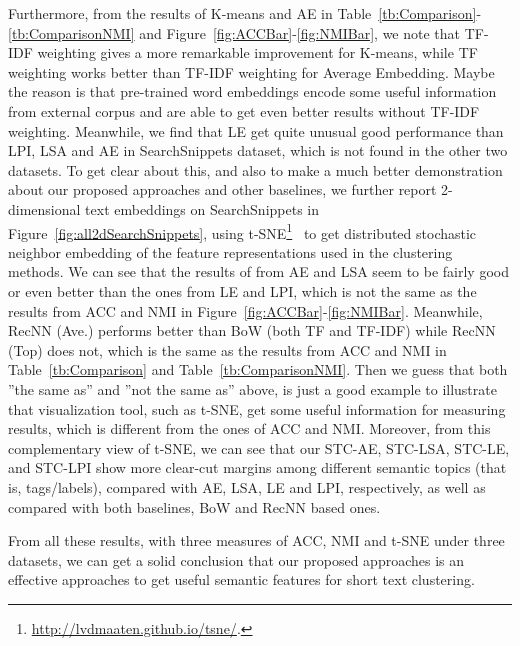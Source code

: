 \documentclass[review]{elsarticle}
\begin{document}
Furthermore, from the results of K-means and AE in Table~\ref{tb:Comparison}-\ref{tb:ComparisonNMI} and Figure~\ref{fig:ACCBar}-\ref{fig:NMIBar}, we note that TF-IDF weighting gives a more remarkable improvement for K-means, while TF weighting works better than TF-IDF weighting for Average Embedding. Maybe the reason is that pre-trained word embeddings encode some useful information from external corpus and are able to get even better results without TF-IDF weighting. Meanwhile, we find that LE get quite unusual good performance than LPI, LSA and AE in SearchSnippets dataset, which is not found in the other two datasets. To get clear about this, and also to make a much better demonstration about our proposed approaches and other baselines, we further report 2-dimensional text embeddings on SearchSnippets in Figure~\ref{fig:all2dSearchSnippets}, using t-SNE\footnote{\url{http://lvdmaaten.github.io/tsne/}.}~\cite{39_van2008visualizing} to get distributed stochastic neighbor embedding of the feature representations used in the clustering methods.
We can see that the results of from AE and LSA seem to be fairly good or even better than the ones from LE and LPI, which is not the same as the results from ACC and NMI in Figure~\ref{fig:ACCBar}-\ref{fig:NMIBar}. Meanwhile, RecNN (Ave.) performs better than BoW (both TF and TF-IDF) while RecNN (Top) does not, which is the same as the results from ACC and NMI in Table~\ref{tb:Comparison} and Table~\ref{tb:ComparisonNMI}. Then we guess that both ''the same as'' and ''not the same as'' above, is just a good example to illustrate that visualization tool, such as t-SNE, get some useful information for measuring results, which is different from the ones of ACC and NMI. Moreover, from this complementary view of t-SNE, we can see that our STC-AE, STC-LSA, STC-LE, and STC-LPI show more clear-cut margins among different semantic topics (that is, tags/labels), compared with AE, LSA, LE and LPI, respectively, as well as compared with both baselines, BoW and RecNN based ones.

From all these results, with three measures of ACC, NMI and t-SNE under three datasets, we can get a solid conclusion that our proposed approaches is an effective approaches to get useful semantic features for short text clustering.
\end{document}
